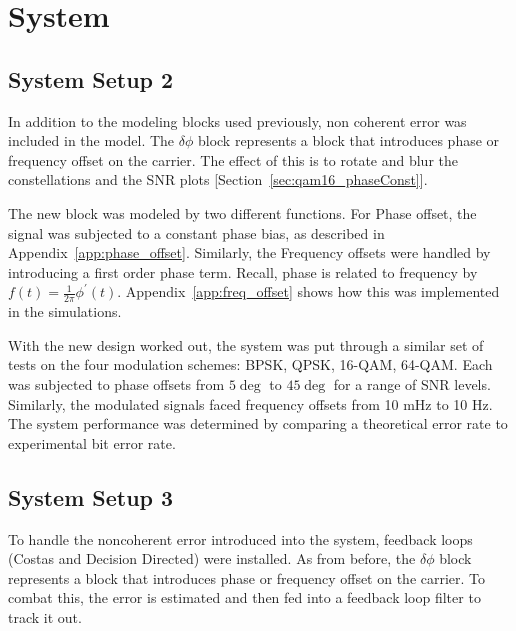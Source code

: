 \documentclass[]{article}
\begin{document}
\newpage
\section{System}

\subsection{System Setup 2}
\label{sec:setup2}

In addition to the modeling blocks used previously, non coherent error was included in the model.  The $\delta\phi$ block represents a block that introduces phase or frequency offset on the carrier.  The effect of this is to rotate and blur the constellations and the SNR plots [Section~\ref{sec:qam16_phaseConst}].

The new block was modeled by two different functions.  For Phase offset, the signal was subjected to a constant phase bias, as described in Appendix~\ref{app:phase_offset}.  Similarly, the Frequency offsets were handled by introducing a first order phase term.  Recall, phase is related to frequency by $f(t) = \frac{1}{2 \pi} \phi^\prime(t)$.  Appendix~\ref{app:freq_offset} shows how this was implemented in the simulations.

With the new design worked out, the system was put through a similar set of tests on the four modulation schemes: BPSK, QPSK, 16-QAM, 64-QAM.  Each was subjected to phase offsets from $5\deg$ to $45\deg$ for a range of SNR levels.  Similarly, the modulated signals faced frequency offsets from 10 mHz to 10 Hz.  The system performance was determined by comparing a theoretical error rate to experimental bit error rate.  



\subsection{System Setup 3}
\label{sec:setup3}
To handle the noncoherent error introduced into the system, feedback loops (Costas and Decision Directed) were installed.  As from before, the $\delta\phi$ block represents a block that introduces phase or frequency offset on the carrier.  To combat this, the error is estimated and then fed into a feedback loop filter to track it out. \\
\end{document}
